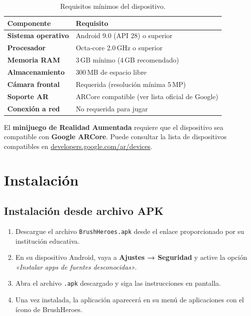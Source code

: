 \documentclass[12pt, a4paper]{article}
\begin{document}
\begin{table}[H]
  \centering
  \caption{Requisitos mínimos del dispositivo.}
  \label{tab:requisitos}
  \begin{tabular}{>{\bfseries}p{4cm} p{8cm}}
    \toprule
    Componente & Requisito \\
    \midrule
    Sistema operativo  & Android 9.0 (API 28) o superior \\
    Procesador         & Octa-core 2.0\,GHz o superior \\
    Memoria RAM        & 3\,GB mínimo (4\,GB recomendado) \\
    Almacenamiento     & 300\,MB de espacio libre \\
    Cámara frontal     & Requerida (resolución mínima 5\,MP) \\
    Soporte AR         & ARCore compatible (ver lista oficial de Google) \\
    Conexión a red     & No requerida para jugar \\
    \bottomrule
  \end{tabular}
\end{table}

\begin{warnbox}
  El \textbf{minijuego de Realidad Aumentada} requiere que el dispositivo sea compatible con
  \textbf{Google ARCore}. Puede consultar la lista de dispositivos compatibles en
  \href{https://developers.google.com/ar/devices}{developers.google.com/ar/devices}.
\end{warnbox}

\section{Instalación}

\subsection{Instalación desde archivo APK}

\begin{enumerate}[leftmargin=1.5cm]
  \item Descargue el archivo \texttt{BrushHeroes.apk} desde el enlace proporcionado por su
        institución educativa.
  \item En su dispositivo Android, vaya a \textbf{Ajustes → Seguridad} y active la opción
        \textit{«Instalar apps de fuentes desconocidas»}.
  \item Abra el archivo \texttt{.apk} descargado y siga las instrucciones en pantalla.
  \item Una vez instalada, la aplicación aparecerá en su menú de aplicaciones con el ícono
        de BrushHeroes.
\end{enumerate}
\end{document}

